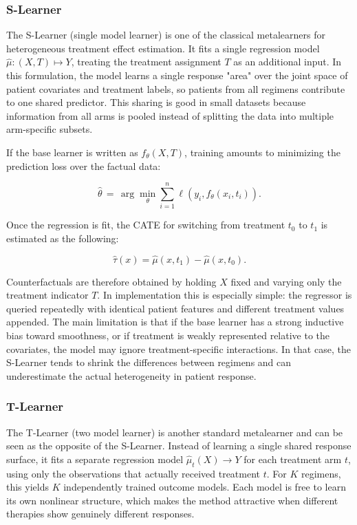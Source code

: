 \documentclass{article}
\begin{document}
\subsubsection*{S-Learner}

The S-Learner (single model learner) is one of the classical metalearners for heterogeneous treatment effect estimation. It fits a single regression model $\hat{\mu} : (X, T) \mapsto Y$, treating the treatment assignment $T$ as an additional input. In this formulation, the model learns a single response "area" over the joint space of patient covariates and treatment labels, so patients from all regimens contribute to one shared predictor. This sharing is good in small datasets because information from all arms is pooled instead of splitting the data into multiple arm-specific subsets.

If the base learner is written as $f_\theta(X, T)$, training amounts to minimizing the prediction loss over the factual data:

\begin{equation}
    \hat{\theta} \,=\, \arg\min_{\theta} \sum_{i=1}^{n} \ell\!\left(y_i, f_\theta(x_i, t_i)\right).
\end{equation}

Once the regression is fit, the CATE for switching from treatment $t_0$ to $t_1$ is estimated as the following:

\begin{equation}
    \hat{\tau}(x) = \hat{\mu}(x, t_1) - \hat{\mu}(x, t_0).
\end{equation}

Counterfactuals are therefore obtained by holding $X$ fixed and varying only the treatment indicator $T$. In implementation this is especially simple: the regressor is queried repeatedly with identical patient features and different treatment values appended. The main limitation is that if the base learner has a strong inductive bias toward smoothness, or if treatment is weakly represented relative to the covariates, the model may ignore treatment-specific interactions. In that case, the S-Learner tends to shrink the differences between regimens and can underestimate the actual heterogeneity in patient response.

\subsubsection*{T-Learner}

The T-Learner (two model learner) is another standard metalearner and can be seen as the opposite of the S-Learner. Instead of learning a single shared response surface, it fits a separate regression model $\hat{\mu}_t(X) \to Y$ for each treatment arm $t$, using only the observations that actually received treatment $t$. For $K$ regimens, this yields $K$ independently trained outcome models. Each model is free to learn its own nonlinear structure, which makes the method attractive when different therapies show genuinely different responses.
\end{document}
